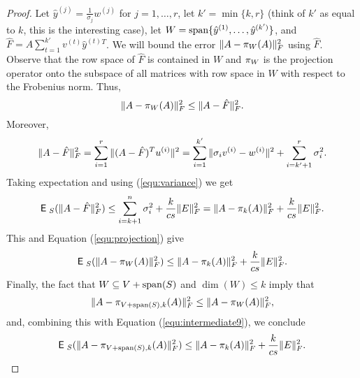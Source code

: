 \documentclass{book}
\numberwithin{exercise}{chapter}
\begin{document}
\begin{proof}
Let ${\hat y}^{(j)} = \frac{1}{\sigma_j} w^{(j)}$ for $j=1,
\dotsc, r$, let $k' = \min \{k, r\}$ (think of $k'$ as equal to
$k$, this is the interesting case), let $W = \operatorname{span} \{{\hat
y}^{(1)}, \dotsc, {\hat y}^{(k')}\}$, and $\hat F = A
\sum_{t=1}^{k'} v^{(t)} {\hat y}^{(t)}{}^T$. We will bound the
error $\|A - \pi_{W}(A)\|_{F}^2$ using $\hat F$. Observe that the
row space of $\hat F$ is contained in $W$ and $\pi_{W}$ is the
projection operator onto the subspace of all matrices with row
space in $W$ with respect to the Frobenius norm. Thus,
\begin{equation}\label{equ:projection}
\|A - \pi_{W} (A)\|_{F}^2 \leq \|A-\hat F\|_{F}^2.
\end{equation}
Moreover,
\begin{equation}\label{equ:effHat}
\|A - \hat F\|_{F}^2
    = \sum_{i=1}^r \|(A-\hat F)^T u^{(i)}\|^2
    = \sum_{i=1}^{k'} \|\sigma_i v^{(i)} - w^{(i)}\|^2 +
    \sum_{i=k'+1}^r \sigma_i^2.
\end{equation}
Taking expectation and using (\ref{equ:variance}) we get
\begin{equation*}%
\E_{S}(\fnorms{A - \hat F} )\leq \sum_{i=k+1}^n \sigma_i^2 +
\frac{k}{cs} \fnorms{E} = \fnorms{A-\proj_k(A)} + \frac{k}{cs}
\fnorms{E}.
\end{equation*}
This and Equation (\ref{equ:projection}) give
\begin{equation}\label{equ:intermediate9}
\hbox{{\sf E}\;}_{S}(\|A - \pi_{W} (A)\|_{F}^2)
    \leq \|A-\pi_k(A)\|_{F}^2 +
\frac{k}{cs} \|E\|_{F}^2.
\end{equation}
Finally, the fact that $W \subseteq V + \operatorname{span}(S)$ and $\dim(W)
\leq k$ imply that
\[
\|A-\pi_{V + \operatorname{span}(S),k}(A)\|_{F}^2 \leq \|A - \pi_{W}
(A)\|_{F}^2,
\]
and, combining this with Equation (\ref{equ:intermediate9}), we
conclude
\[
\hbox{{\sf E}\;}_S(\|A-\pi_{V + \operatorname{span}(S),k}(A)\|_{F}^2) \leq
\|A-\pi_k(A)\|_{F}^2 + \frac{k}{cs} \|E\|_{F}^2.
\]
\end{proof}
\end{document}
